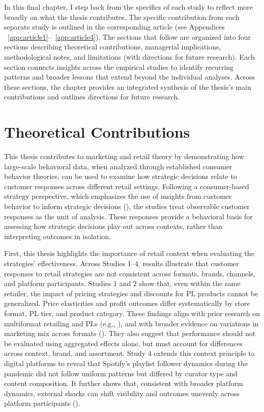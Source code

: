 In this final chapter, I step back from the specifics of each study to reflect more broadly on what the thesis contributes. The specific contribution from each separate study is outlined in the corresponding article (see Appendices ~\ref{app:article1}–~\ref{app:article4}). The sections that follow are organized into four sections describing theoretical contributions, managerial implications, methodological notes, and limitations (with directions for future research). Each section connects insights across the empirical studies to identify recurring patterns and broader lessons that extend beyond the individual analyses. Across these sections, the chapter provides an integrated synthesis of the thesis’s main contributions and outlines directions for future research.

\section{Theoretical Contributions}

This thesis contributes to marketing and retail theory by demonstrating how large-scale behavioral data, when analyzed through established consumer behavior theories, can be used to examine how strategic decisions relate to customer responses across different retail settings. Following a consumer-based strategy perspective, which emphasizes the use of insights from customer behavior to inform strategic decisions (\cite{Hamilton2016-ca}), the studies treat observable customer responses as the unit of analysis. These responses provide a behavioral basis for assessing how strategic decisions play out across contexts, rather than interpreting outcomes in isolation.

First, this thesis highlights the importance of retail context when evaluating the strategies’ effectiveness. Across Studies 1–4, results illustrate that customer responses to retail strategies are not consistent across formats, brands, channels, and platform participants. Studies 1 and 2 show that, even within the same retailer, the impact of pricing strategies and discounts for PL products cannot be generalized. Price elasticities and profit outcomes differ systematically by store format, PL tier, and product category. These findings align with prior research on multiformat retailing and PLs (e.g., \cite{Geyskens2010-bx,Haans2011-cv}), and with broader evidence on variations in marketing mix across formats (\cite{Wichmann2021-vm}). They also suggest that performance should not be evaluated using aggregated effects alone, but must account for differences across context, brand, and assortment. Study 4 extends this context principle to digital platforms to reveal that Spotify’s playlist follower dynamics during the pandemic did not follow uniform patterns but differed by curator type and content composition. It further shows that, consistent with broader platform dynamics, external shocks can shift visibility and outcomes unevenly across platform participants (\cite{Wichmann2022-gq}).


